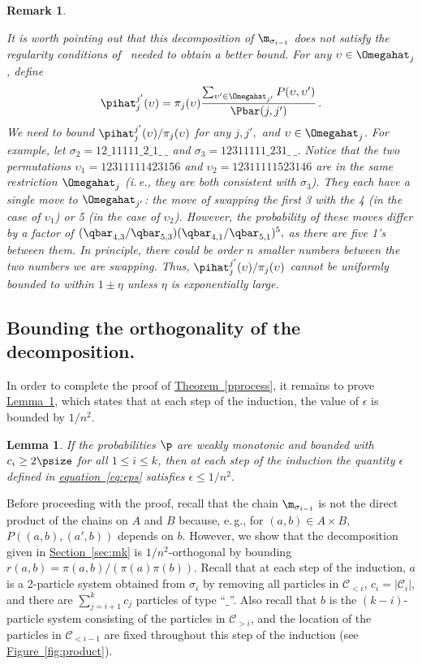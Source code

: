 \documentclass[11pt]{article}
\newtheorem{lemma}[theorem]{Lemma}
\newtheorem{remark}[theorem]{Remark}
\providecommand{\ie}{i.\,e.}
\providecommand{\eg}{e.\,g.}
\providecommand{\expref}[2]{\texorpdfstring{\hyperref[#2]{#1~\ref{#2}}}{#1~\ref{#2}}}
\providecommand{\expeqref}[2]{\texorpdfstring{\hyperref[#2]{#1~\eqref{#2}}}{#1~\eqref{#2}}}
\begin{document}
\begin{remark}\label{rem:eta}

It is worth pointing out that this decomposition of $\m_{\sigma_{i-1}}$ 
does not satisfy the 
regularity conditions of~\cite{jstv04} needed to obtain a better bound.  
For any $\upsilon\in \Omegahat_j$, define 
\[\pihat_j^{j'}(\upsilon)=\pi_j(\upsilon)\frac{\sum_{\upsilon'\in\Omegahat_{j'}}P(\upsilon,\upsilon')}{\Pbar(j,j')}\,.\] 
We need to bound $\pihat_j^{j'}(\upsilon)/\pi_j(\upsilon)$ for any 
$j,j',$ and $\upsilon\in\Omegahat_j$.   For example, let $\sigma_{2} = 
12\_11111\_2\_1\_~\_$ and $\sigma_3 = 12311111\_231\_~\_$. Notice that 
the two permutations $\upsilon_1=12311111423156$ and 
$\upsilon_2=12311111523146$ are in the same restriction $\Omegahat_j$ 
(\ie,  they are both consistent with $\sigma_3$).  They each have a 
single move to $\Omegahat_{j'}$: the move of swapping the first 3 with 
the 4 (in the case of $\upsilon_1$) or 5 (in the case of $\upsilon_2$).  
However, the probability of these moves differ by a factor of 
$(\qbar_{4,3}/\qbar_{5,3})(\qbar_{4,1}/\qbar_{5,1})^5,$ as there are five 1's between 
them.  In principle, there could be order $n$ smaller numbers between 
the two numbers we are swapping.  Thus, 
$\pihat_j^{j'}(\upsilon)/\pi_j(\upsilon)$ cannot be uniformly bounded 
to within $1\pm \eta$ unless $\eta$ is exponentially large. 

\end{remark}

%
%
\subsection{Bounding the orthogonality of the decomposition.}\label{sec:ortho}  %

In order to complete the proof of \expref{Theorem}{pprocess}, it remains to prove
\expref{Lemma}{lem:perms}, which states that %
%
at each step of the induction,
the value of $\epsilon$ is bounded by $1/n^2$. %

\begin{lemma}\label{lem:perms}
If the probabilities $\p$ are weakly monotonic and bounded with 
$c_i\geq 2\psize$ for all $1\leq i \leq k$, then at each step of 
the induction %
the quantity $\epsilon$ defined in \expeqref{equation}{eq:eps} 
satisfies $\epsilon\leq 1/n^2$. %
\end{lemma}

Before proceeding with the proof, 
recall that the chain $\m_{\sigma_{i-1}}$ is not the direct product of 
the chains on $A$ and $B$ because, \eg, for $(a,b) \in A\times B$, 
$P((a,b),(a',b))$ depends on $b$. However, we show that the 
decomposition given in \expref{Section}{sec:mk} is $1/n^2$-orthogonal by 
bounding $r(a,b) = \pi(a,b)/(\pi(a)\pi(b))$.  Recall that at each step 
of the induction, $a$ is a 2-particle system obtained from $\sigma_i$ 
by removing all particles in $\mathcal{C}_{< i}$, $c_i = 
|\mathcal{C}_i|$, and there are $\sum^{k}_{j=i+1}c_j$ particles of type 
``$\_$''.  Also recall that $b$ is the $(k-i)$-particle system 
consisting of the particles in $\mathcal{C}_{>i}$, and the location of 
the particles in $\mathcal{C}_{< i-1}$ are fixed throughout this step 
of the induction (see \expref{Figure}{fig:product}).  
\end{document}
